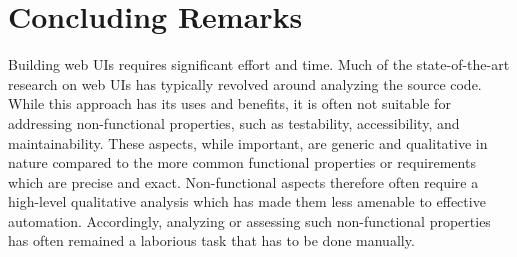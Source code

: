 
\let\oldaddcontentsline\addcontentsline
\newcommand{\stoptocentries}{\renewcommand{\addcontentsline}[3]{}}
\newcommand{\starttocentries}{\let\addcontentsline\oldaddcontentsline}

\chapter{Concluding Remarks}
\label{chp:conclusions}

Building web UIs requires significant effort and time. Much of the state-of-the-art research on web UIs has typically revolved around  analyzing the source code. 
While this approach has its uses and benefits, it is often not suitable for addressing non-functional properties, such as testability, accessibility, and 
maintainability. These aspects, while important, are generic and qualitative in nature compared to the more common functional properties or requirements which are precise and exact.  
Non-functional aspects therefore often require a high-level qualitative analysis which has made them less amenable to effective automation. Accordingly, analyzing or assessing 
such non-functional properties has often remained a laborious task that has to be done manually. 


